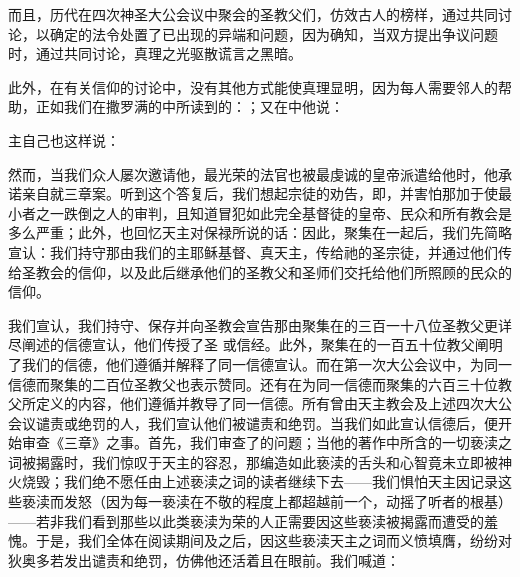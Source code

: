而且，历代在四次神圣大公会议中聚会的圣教父们，仿效古人的榜样，通过共同讨论，以确定的法令处置了已出现的异端和问题，因为确知，当双方提出争议问题时，通过共同讨论，真理之光驱散谎言之黑暗。\par

此外，在有关信仰的讨论中，没有其他方式能使真理显明，因为每人需要邻人的帮助，正如我们在撒罗满的中所读到的：；又在中他说：\par

主自己也这样说：\par

然而，当我们众人屡次邀请他，最光荣的法官也被最虔诚的皇帝派遣给他时，他承诺亲自就三章案。听到这个答复后，我们想起宗徒的劝告，即，并害怕那加于使最小者之一跌倒之人的审判，且知道冒犯如此完全基督徒的皇帝、民众和所有教会是多么严重；此外，也回忆天主对保禄所说的话：因此，聚集在一起后，我们先简略宣认：我们持守那由我们的主耶稣基督、真天主，传给祂的圣宗徒，并通过他们传给圣教会的信仰，以及此后继承他们的圣教父和圣师们交托给他们所照顾的民众的信仰。\par

我们宣认，我们持守、保存并向圣教会宣告那由聚集在的三百一十八位圣教父更详尽阐述的信德宣认，他们传授了圣  或信经。此外，聚集在的一百五十位教父阐明了我们的信德，他们遵循并解释了同一信德宣认。而在第一次大公会议中，为同一信德而聚集的二百位圣教父也表示赞同。还有在为同一信德而聚集的六百三十位教父所定义的内容，他们遵循并教导了同一信德。所有曾由天主教会及上述四次大公会议谴责或绝罚的人，我们宣认他们被谴责和绝罚。当我们如此宣认信德后，便开始审查《三章》之事。首先，我们审查了的问题；当他的著作中所含的一切亵渎之词被揭露时，我们惊叹于天主的容忍，那编造如此亵渎的舌头和心智竟未立即被神火烧毁；我们绝不愿任由上述亵渎之词的读者继续下去——我们惧怕天主因记录这些亵渎而发怒（因为每一亵渎在不敬的程度上都超越前一个，动摇了听者的根基）——若非我们看到那些以此类亵渎为荣的人正需要因这些亵渎被揭露而遭受的羞愧。于是，我们全体在阅读期间及之后，因这些亵渎天主之词而义愤填膺，纷纷对狄奥多若发出谴责和绝罚，仿佛他还活着且在眼前。我们喊道：\par

